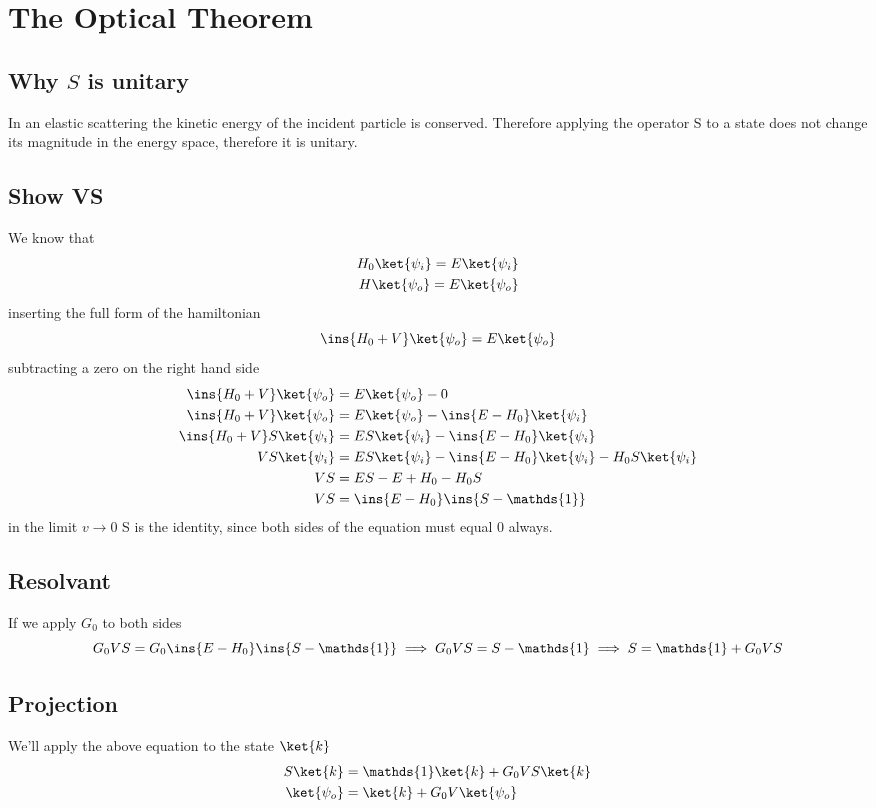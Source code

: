 \section{The Optical Theorem}
\subsection{Why \(S\) is unitary}
In an elastic scattering the kinetic energy of the incident particle is conserved. Therefore applying the operator S to a state does not change its magnitude in the energy space, therefore it is unitary.

\subsection{Show VS}
We know that
\begin{align}
	H_0\ket{\psi_i} = E\ket{\psi_i} \\
	H\ket{\psi_o} = E\ket{\psi_o}
\end{align}
inserting the full form of the hamiltonian
\begin{equation}
	\ins{H_0+V}\ket{\psi_o} = E\ket{\psi_o}
\end{equation}
subtracting a zero on the right hand side
\begin{align}
	\ins{H_0+V}\ket{\psi_o} &= E\ket{\psi_o} - 0 \\
	\ins{H_0+V}\ket{\psi_o} &= E\ket{\psi_o} - \ins{E-H_0}\ket{\psi_i} \\
	\ins{H_0+V}S\ket{\psi_i} &= ES\ket{\psi_i}- \ins{E-H_0}\ket{\psi_i} \\
	VS\ket{\psi_i} &= ES\ket{\psi_i}- \ins{E-H_0}\ket{\psi_i} - H_0S\ket{\psi_i} \\
	VS &= ES - E + H_0 - H_0S\\
	VS &= \ins{E-H_0}\ins{S-\mathds{1}}
\end{align}
in the limit \(v\rightarrow 0\) S is the identity, since both sides of the equation must equal 0 always.
\subsection{Resolvant}
If we apply \(G_0\) to both sides
\begin{equation}
	G_0 VS = G_0\ins{E-H_0}\ins{S-\mathds{1}} \implies G_0 VS = S-\mathds{1} \implies S = \mathds{1} + G_0 VS
\end{equation}
\subsection{Projection}
We'll apply the above equation to the state \(\ket{k}\)
\begin{align}
	S\ket{k} &= \mathds{1}\ket{k} + G_0 VS\ket{k} \\
	\ket{\psi_o} &= \ket{k} + G_0 V\ket{\psi_o}
\end{align}
